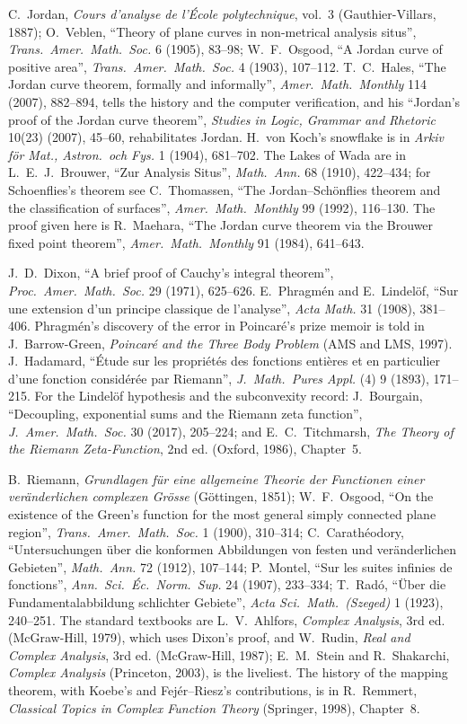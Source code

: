 C.~Jordan, \emph{Cours d'analyse de l'\'Ecole polytechnique}, vol.~3 (Gauthier-Villars, 1887); O.~Veblen, ``Theory of plane curves in non-metrical analysis situs'', \emph{Trans.\ Amer.\ Math.\ Soc.}
6 (1905), 83--98; W.~F.~Osgood, ``A Jordan curve of positive area'', \emph{Trans.\ Amer.\ Math.\ Soc.} 4 (1903), 107--112. T.~C.~Hales, ``The Jordan curve theorem, formally and informally'', \emph{Amer.\ Math.\
Monthly} 114 (2007), 882--894, tells the history and the computer verification, and his ``Jordan's proof of the Jordan curve theorem'', \emph{Studies in Logic, Grammar and Rhetoric}
10(23) (2007), 45--60, rehabilitates Jordan. H.~von Koch's snowflake is in \emph{Arkiv f\"or Mat., Astron.\ och Fys.} 1 (1904), 681--702. The Lakes of Wada are in L.~E.~J.~Brouwer, ``Zur Analysis
Situs'', \emph{Math.\ Ann.} 68 (1910), 422--434; for Schoenflies's theorem see C.~Thomassen, ``The Jordan--Sch\"onflies theorem and the classification of surfaces'', \emph{Amer.\ Math.\ Monthly} 99
(1992), 116--130. The proof given here is R.~Maehara, ``The Jordan curve theorem via the Brouwer fixed point theorem'', \emph{Amer.\
Math.\ Monthly} 91 (1984), 641--643.

J.~D.~Dixon, ``A brief proof of Cauchy's integral theorem'', \emph{Proc.\ Amer.\ Math.\ Soc.} 29 (1971), 625--626. E.~Phragm\'en and E.~Lindel\"of, ``Sur une extension d'un principe classique de
l'analyse'', \emph{Acta Math.} 31 (1908), 381--406. Phragm\'en's discovery of the error in Poincar\'e's prize memoir is told in J.~Barrow-Green, \emph{Poincar\'e and the Three
Body Problem} (AMS and LMS, 1997). J.~Hadamard, ``\'Etude sur les propri\'et\'es des fonctions enti\`eres et en particulier d'une fonction consid\'er\'ee par Riemann'', \emph{J.\ Math.\
Pures Appl.} (4) 9 (1893), 171--215. For the Lindel\"of hypothesis and the subconvexity record: J.~Bourgain, ``Decoupling, exponential sums and the Riemann zeta function'', \emph{J.\ Amer.\ Math.\
Soc.} 30 (2017), 205--224; and E.~C.~Titchmarsh, \emph{The Theory of the Riemann Zeta-Function}, 2nd ed. (Oxford, 1986), Chapter~5.

B.~Riemann, \emph{Grundlagen f\"ur eine allgemeine Theorie der Functionen einer ver\"anderlichen complexen Gr\"osse} (G\"ottingen, 1851); W.~F.~Osgood, ``On the existence of the Green's
function for the most general simply connected plane region'', \emph{Trans.\ Amer.\ Math.\ Soc.} 1 (1900), 310--314; C.~Carath\'eodory, ``Untersuchungen \"uber die konformen Abbildungen von
festen und ver\"anderlichen Gebieten'', \emph{Math.\ Ann.} 72 (1912), 107--144; P.~Montel, ``Sur les suites infinies de fonctions'', \emph{Ann.\
Sci.\ \'Ec.\ Norm.\ Sup.} 24 (1907), 233--334; T.~Rad\'o, ``\"Uber die Fundamentalabbildung schlichter Gebiete'', \emph{Acta Sci.\ Math.\ (Szeged)} 1 (1923), 240--251. The standard textbooks are
L.~V.~Ahlfors, \emph{Complex Analysis}, 3rd ed. (McGraw-Hill, 1979), which uses Dixon's proof, and W.~Rudin, \emph{Real and Complex Analysis}, 3rd ed. (McGraw-Hill, 1987); E.~M.~Stein and
R.~Shakarchi, \emph{Complex Analysis} (Princeton, 2003), is the liveliest. The history of the mapping theorem, with Koebe's and Fej\'er--Riesz's contributions, is in R.~Remmert,
\emph{Classical Topics in Complex Function Theory} (Springer, 1998), Chapter~8.

